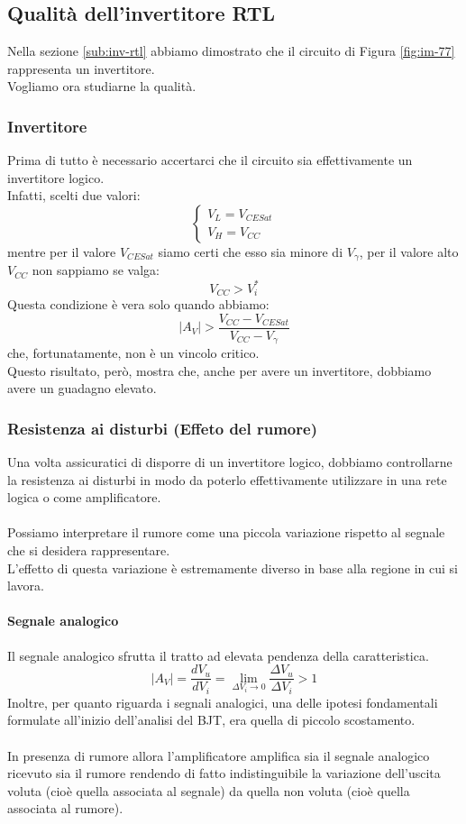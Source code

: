 \documentclass{article}
\numberwithin{equation}{subsection}
\begin{document}
	\subsection{Qualità dell'invertitore RTL}
	Nella sezione \ref{sub:inv-rtl} abbiamo dimostrato che il circuito di Figura \ref{fig:im-77} rappresenta un invertitore. \\
	Vogliamo ora studiarne la qualità.
	\subsubsection{Invertitore}
	Prima di tutto è necessario accertarci che il circuito sia effettivamente un invertitore logico. \\
	Infatti, scelti due valori:
	$$\begin{cases} V_L = V_{CESat} \\ V_H = V_{CC} \end{cases}$$
	mentre per il valore $V_{CESat}$ siamo certi che esso sia minore di $V_\gamma$, per il valore alto $V_{CC}$ non sappiamo se valga:
	$$V_{CC} > V_i^*$$
	Questa condizione è vera solo quando abbiamo:
	$$|A_V| > \frac{V_{CC} - V_{CESat}}{V_{CC} - V_\gamma}$$
	che, fortunatamente, non è un vincolo critico. \\
	Questo risultato, però, mostra che, anche per avere un invertitore, dobbiamo avere un guadagno elevato.
	\subsubsection{Resistenza ai disturbi (Effeto del rumore)}
	\label{subsub:res-dist}
	Una volta assicuratici di disporre di un invertitore logico, dobbiamo controllarne la resistenza ai disturbi in modo da poterlo effettivamente utilizzare in una rete logica o come amplificatore.\\\\
	Possiamo interpretare il rumore come una piccola variazione rispetto al segnale che si desidera rappresentare. \\
	L’effetto di questa variazione è estremamente diverso in base alla regione in cui si lavora.
	\paragraph{Segnale analogico}
	Il segnale analogico sfrutta il tratto ad elevata pendenza della caratteristica.
	$$|A_V| = \frac{dV_u}{dV_i} = \lim_{\Delta V_i \rightarrow 0} \frac{\Delta V_u}{\Delta V_i} > 1$$
	Inoltre, per quanto riguarda i segnali analogici, una delle ipotesi fondamentali formulate all’inizio dell’analisi del BJT, era quella di piccolo scostamento.\\\\
	In presenza di rumore allora l’amplificatore amplifica sia il segnale analogico ricevuto sia il rumore rendendo di fatto indistinguibile la variazione dell’uscita voluta (cioè quella associata al segnale) da quella non voluta (cioè quella associata al rumore).
\end{document}
